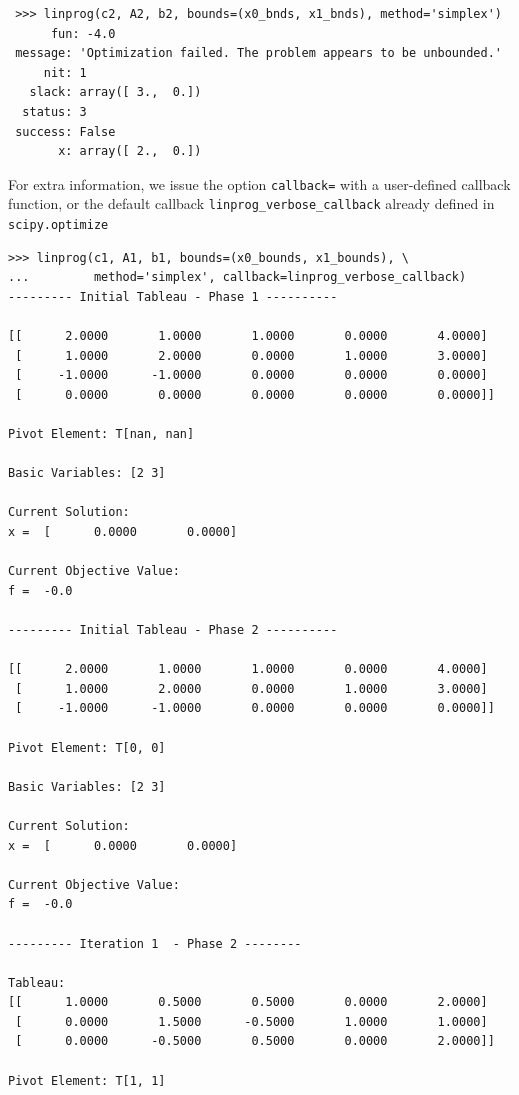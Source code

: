\begin{example}
\begin{verbatim}
 >>> linprog(c2, A2, b2, bounds=(x0_bnds, x1_bnds), method='simplex')
      fun: -4.0
 message: 'Optimization failed. The problem appears to be unbounded.'
     nit: 1
   slack: array([ 3.,  0.])
  status: 3
 success: False
       x: array([ 2.,  0.])

\end{verbatim}
\end{example}

For extra information, we issue the option \texttt{callback=} with a user-defined callback function, or the default callback \texttt{linprog\_verbose\_callback} already defined in \texttt{scipy.optimize}
\begin{verbatim}
>>> linprog(c1, A1, b1, bounds=(x0_bounds, x1_bounds), \
...         method='simplex', callback=linprog_verbose_callback)
--------- Initial Tableau - Phase 1 ----------

[[      2.0000       1.0000       1.0000       0.0000       4.0000]
 [      1.0000       2.0000       0.0000       1.0000       3.0000]
 [     -1.0000      -1.0000       0.0000       0.0000       0.0000]
 [      0.0000       0.0000       0.0000       0.0000       0.0000]]

Pivot Element: T[nan, nan]

Basic Variables: [2 3]

Current Solution:
x =  [      0.0000       0.0000]

Current Objective Value:
f =  -0.0

--------- Initial Tableau - Phase 2 ----------

[[      2.0000       1.0000       1.0000       0.0000       4.0000]
 [      1.0000       2.0000       0.0000       1.0000       3.0000]
 [     -1.0000      -1.0000       0.0000       0.0000       0.0000]]

Pivot Element: T[0, 0]

Basic Variables: [2 3]

Current Solution:
x =  [      0.0000       0.0000]

Current Objective Value:
f =  -0.0

--------- Iteration 1  - Phase 2 --------

Tableau:
[[      1.0000       0.5000       0.5000       0.0000       2.0000]
 [      0.0000       1.5000      -0.5000       1.0000       1.0000]
 [      0.0000      -0.5000       0.5000       0.0000       2.0000]]

Pivot Element: T[1, 1]


\end{verbatim}

